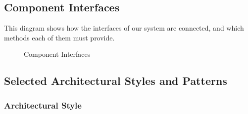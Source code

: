 \documentclass[english]{article}
\begin{document}
\newpage
\subsection{Component Interfaces}

This diagram shows how the interfaces of our system are connected, and which methods each of them must provide.

\begin{figure}[H]
	\centering
	\caption{Component Interfaces}
	\label{compinterfaces}
\end{figure}

\subsection{Selected Architectural Styles and Patterns}

\subsubsection{Architectural Style}
\end{document}
